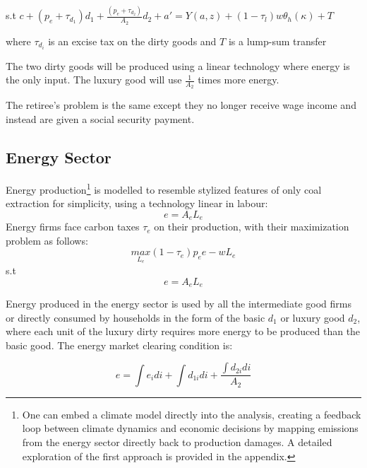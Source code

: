\documentclass[12pt,a4paper]{article}
\begin{document}
\begin{center}
s.t $c+(p_e+\tau_{d_1})d_1+\frac{(p_e+\tau_{d_2})}{A_2} d_2+a'=Y(a,z)+(1-\tau_l)w\theta_h(\kappa) + T $

where $\tau_{d_i}$ is an excise tax on the dirty goods and $T$ is a lump-sum transfer
\end{center}

The two dirty goods will be produced using a linear technology where energy is the only input. The luxury good will use $\frac{1}{A_2}$ times more energy.
    
       
  The retiree's problem is the same except they no longer receive wage income and instead are given a social security payment.
 
 
\subsection{\normalsize Energy Sector}
\hspace*{6mm} Energy production\footnote{One can embed a climate model directly into the analysis, creating a feedback loop between climate dynamics and economic decisions by mapping emissions from the energy sector directly back to production damages. A detailed exploration of the first approach is provided in the appendix.} is modelled to resemble stylized features of only coal extraction for simplicity, using a technology linear in labour:
\begin{equation}
e=A_{e}L_{e}
\end{equation}
Energy firms face carbon taxes $\tau_e$ on their production, with their maximization problem as follows:
\[\underset{L_{e}}{max} (1-\tau_e)p_{e}e-wL_{e}\]
s.t  \[e=A_{e}L_{e}\]

Energy produced in the energy sector is used by all the intermediate good firms or directly consumed by households in the form of the basic $d_1$ or luxury good $d_2$, where each unit of the luxury dirty requires more energy to be produced than the basic good. The energy market clearing condition is:

\[e=\int e_{i}di+\int d_{1i} di + \frac{\int d_{2i} di }{A_2}\]
\end{document}
